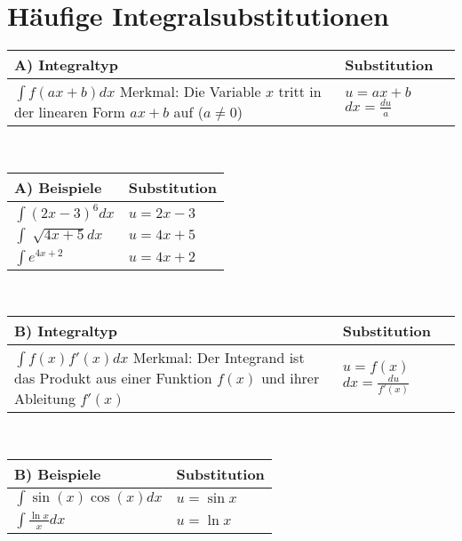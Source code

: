 \documentclass[../main.tex]{subfiles}
\begin{document}
\section{Häufige Integralsubstitutionen}
\begin{tabularx}{0.9\textwidth} { 
    >{\centering\arraybackslash}X 
    >{\centering\arraybackslash}X  }
    \rowcolor{lightgray} A) Integraltyp & Substitution \\ [7pt]
    \hline
    $ \int f(ax + b)dx$ 
    \newline \newline
    Merkmal: Die Variable $x$ tritt in der linearen Form $ax+b$ auf ($a \neq 0$)
    &
    $ u = ax + b$
    \newline 
    $ dx = \frac{du}{a}$
    \\ [7pt]
\end{tabularx}
\\ [7pt]

\begin{tabularx}{0.9\textwidth} { 
    >{\centering\arraybackslash}X 
    >{\centering\arraybackslash}X  }
    \rowcolor{lightgray} A) Beispiele & Substitution \\ [7pt]
    \hline
    $\int (2x - 3)^6dx$ 
    &
    $u=2x-3$ 
    \\ [7pt]
    $\int \sqrt[]{4x + 5}dx$
    &
    $ u=4x+5$
    \\ [7pt]
    $ \int e^{4x+2} $
    &
    $u = 4x+2$
    \\ [7pt]
\end{tabularx}
\\ [7pt]

\begin{tabularx}{0.9\textwidth} { 
    >{\centering\arraybackslash}X 
    >{\centering\arraybackslash}X  }
    \rowcolor{lightgray} B) Integraltyp & Substitution \\ [7pt]
    \hline
    $ \int f(x)f'(x)dx$
    \newline \newline
    Merkmal: Der Integrand ist das Produkt aus einer Funktion $f(x)$ 
    und ihrer
    Ableitung $f'(x)$
    &
    $ u = f(x)$
    \newline 
    $ dx = \frac{du}{f'(x)}$
    \\ [7pt]
\end{tabularx}
\\ [7pt]

\begin{tabularx}{0.9\textwidth} { 
    >{\centering\arraybackslash}X 
    >{\centering\arraybackslash}X  }
    \rowcolor{lightgray} B) Beispiele & Substitution \\ [7pt]
    \hline
    $\int \sin (x) \cos (x) dx$ & $ u = \sin x$
    \\ [7pt]
    $\int \frac{\ln x}{x}dx$ & $u=\ln x$
    \\ [7pt]
\end{tabularx}
\\ [7pt]
\end{document}
